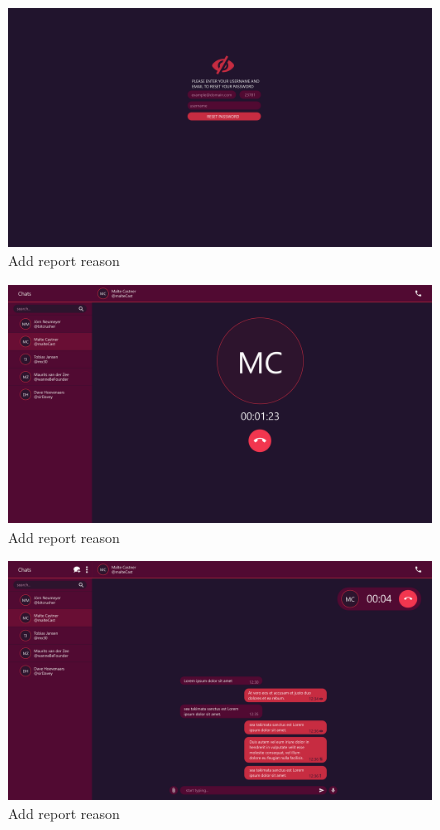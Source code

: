 \begin{figure}[h]
    \centering
    \includegraphics[width=1.0\textwidth]{./graphics/wireframes/ForgotPassword}
    \caption{Add report reason}
    \label{fig:figure18}
\end{figure}

\begin{figure}[h]
    \centering
    \includegraphics[width=1.0\textwidth]{./graphics/wireframes/HaveACall}
    \caption{Add report reason}
    \label{fig:figure19}
\end{figure}

\begin{figure}[h]
    \centering
    \includegraphics[width=1.0\textwidth]{./graphics/wireframes/HaveACallWhileChating}
    \caption{Add report reason}
    \label{fig:figure20}
\end{figure}

